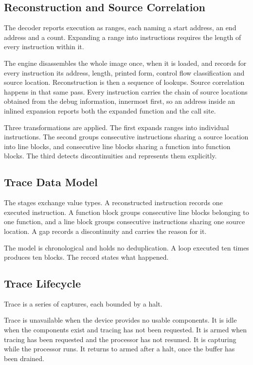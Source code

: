 \subsection{Reconstruction and Source Correlation}
The decoder reports execution as ranges, each naming a start address, an end address and a count. Expanding a range into instructions requires the length of every instruction within it.

The engine disassembles the whole image once, when it is loaded, and records for every instruction its address, length, printed form, control flow classification and source location. Reconstruction is then a sequence of lookups. Source correlation happens in that same pass. Every instruction carries the chain of source locations obtained from the debug information, innermost first, so an address inside an inlined expansion reports both the expanded function and the call site.

Three transformations are applied. The first expands ranges into individual instructions. The second groups consecutive instructions sharing a source location into line blocks, and consecutive line blocks sharing a function into function blocks. The third detects discontinuities and represents them explicitly.

\subsection{Trace Data Model}
The stages exchange value types. A reconstructed instruction records one executed instruction. A function block groups consecutive line blocks belonging to one function, and a line block groups consecutive instructions sharing one source location. A gap records a discontinuity and carries the reason for it.

The model is chronological and holds no deduplication. A loop executed ten times produces ten blocks. The record states what happened.

\subsection{Trace Lifecycle}
\label{subsec:trace_lifecycle}
Trace is a series of captures, each bounded by a halt.

Trace is unavailable when the device provides no usable components. It is idle when the components exist and tracing has not been requested. It is armed when tracing has been requested and the processor has not resumed. It is capturing while the processor runs. It returns to armed after a halt, once the buffer has been drained.

